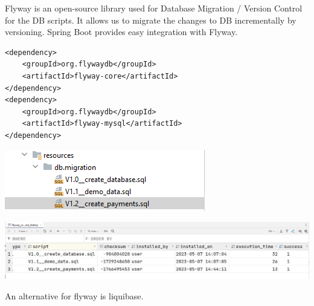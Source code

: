 Flyway is an open-source library used for Database Migration / Version Control for the DB scripts. It allows us to migrate the changes to DB incrementally by versioning.
Spring Boot provides easy integration with Flyway.



\begin{verbatim}
<dependency>
    <groupId>org.flywaydb</groupId>
    <artifactId>flyway-core</artifactId>
</dependency>
<dependency>
    <groupId>org.flywaydb</groupId>
    <artifactId>flyway-mysql</artifactId>
</dependency>
\end{verbatim}

\includegraphics{./images/chapter-tx/flyway2.png}

\includegraphics[width=\textwidth]{./images/chapter-tx/flyway1.png}

An alternative for flyway is liquibase.





